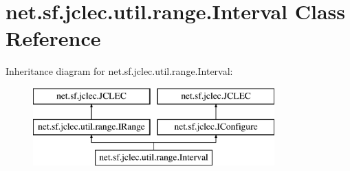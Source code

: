\hypertarget{classnet_1_1sf_1_1jclec_1_1util_1_1range_1_1_interval}{\section{net.\-sf.\-jclec.\-util.\-range.\-Interval Class Reference}
\label{classnet_1_1sf_1_1jclec_1_1util_1_1range_1_1_interval}
}
Inheritance diagram for net.\-sf.\-jclec.\-util.\-range.\-Interval\-:\begin{figure}[H]
\begin{center}
\leavevmode
\includegraphics[height=3.000000cm]{classnet_1_1sf_1_1jclec_1_1util_1_1range_1_1_interval}
\end{center}
\end{figure}
